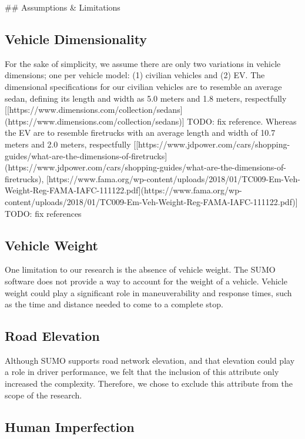 ## Assumptions & Limitations

\subsection{Vehicle Dimensionality}

For the sake of simplicity, we assume there are only two variations in vehicle dimensions; one per vehicle model: (1) civilian vehicles and (2) \acrshort{EV}.
The dimensional specifications for our civilian vehicles are to resemble an average sedan, defining \acrshort{its} length and width as 5.0 meters and 1.8 meters, respectfully [[https://www.dimensions.com/collection/sedans](https://www.dimensions.com/collection/sedans)] {TODO: fix reference}.
Whereas the \acrshort{EV} are to resemble firetrucks with an average length and width of 10.7 meters and 2.0 meters, respectfully [[https://www.jdpower.com/cars/shopping-guides/what-are-the-dimensions-of-firetrucks](https://www.jdpower.com/cars/shopping-guides/what-are-the-dimensions-of-firetrucks), [https://www.fama.org/wp-content/uploads/2018/01/TC009-Em-Veh-Weight-Reg-FAMA-IAFC-111122.pdf](https://www.fama.org/wp-content/uploads/2018/01/TC009-Em-Veh-Weight-Reg-FAMA-IAFC-111122.pdf)] {TODO: fix references}

\subsection{Vehicle Weight}

One limitation to our research is the absence of vehicle weight. The SUMO software does not provide a way to account for the weight of a vehicle. Vehicle weight could play a significant role in maneuverability and response times, such as the time and distance needed to come to a complete stop.

\subsection{Road Elevation}

Although SUMO supports road network elevation, and that elevation could play a role in driver performance, we felt that the inclusion of this attribute only increased the complexity. Therefore, we chose to exclude this attribute from the scope of the research.

\subsection{Human Imperfection}

